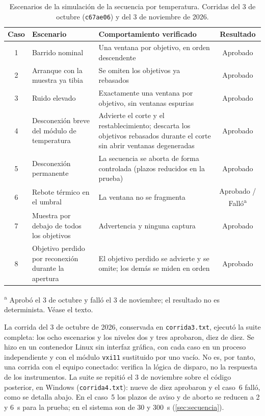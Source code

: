 \begin{table}[htbp]
  \centering
  \caption{Escenarios de la simulación de la secuencia por temperatura.
    Corridas del 3 de octubre (\texttt{c67ae06}) y del 3 de noviembre de 2026.}
  \label{tab:casos_simulador}
  \small
  \begin{tabularx}{\textwidth}{c >{\raggedright\arraybackslash}p{4.4cm} X c}
    \toprule
    Caso & Escenario & Comportamiento verificado & Resultado \\
    \midrule
    1 & Barrido nominal & Una ventana por objetivo, en orden descendente & Aprobado \\
    2 & Arranque con la muestra ya tibia & Se omiten los objetivos ya rebasados & Aprobado \\
    3 & Ruido elevado & Exactamente una ventana por objetivo, sin ventanas espurias & Aprobado \\
    4 & Desconexión breve del módulo de temperatura & Advierte el corte y el restablecimiento; descarta los objetivos rebasados durante el corte sin abrir ventanas degeneradas & Aprobado \\
    5 & Desconexión permanente & La secuencia se aborta de forma controlada (plazos reducidos en la prueba) & Aprobado \\
    6 & Rebote térmico en el umbral & La ventana no se fragmenta & Aprobado / Falló\textsuperscript{a} \\
    7 & Muestra por debajo de todos los objetivos & Advertencia y ninguna captura & Aprobado \\
    8 & Objetivo perdido por reconexión durante la apertura & El objetivo perdido se advierte y se omite; los demás se miden en orden & Aprobado \\
    \bottomrule
  \end{tabularx}

  \vspace{0.3em}
  \begin{minipage}{0.92\textwidth}
    \footnotesize
    \textsuperscript{a} Aprobó el 3 de octubre y falló el 3 de noviembre;
    el resultado no es determinista. Véase el texto.
  \end{minipage}
\end{table}

La corrida del 3 de octubre de 2026, conservada en
\texttt{corrida3.txt}, ejecutó la suite completa: los ocho escenarios y
los niveles dos y tres aprobaron, diez de diez. Se hizo en un contenedor
Linux sin interfaz gráfica, con cada caso en un proceso independiente y
con el módulo \texttt{vxi11} sustituido por uno vacío. No es, por tanto,
una corrida con el equipo conectado: verifica la lógica de disparo, no
la respuesta de los instrumentos. La suite se repitió el 3 de noviembre
sobre el código posterior, en Windows (\texttt{corrida4.txt}): nueve de
diez aprobaron y el caso~6 falló, como se detalla abajo. En el caso~5
los plazos de aviso y de aborto se reducen a 2 y \SI{6}{\second} para
la prueba; en el sistema son de 30 y \SI{300}{\second}
(\cref{sec:secuencia}).

